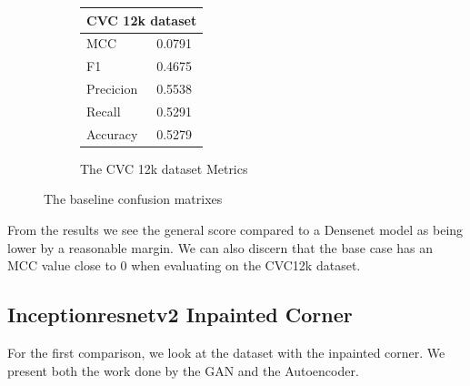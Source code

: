 \begin{figure}[h]
\begin{subfigure}[b]{0.25\textwidth}
        \begin{tabular}{ll}
        \toprule
        \multicolumn{2}{c}{CVC 12k dataset}        \\
        \midrule
        MCC 		& 0.0791 \\
        F1  		& 0.4675 \\
        Precicion  	& 0.5538 \\
        Recall     	& 0.5291 \\
        Accuracy	& 0.5279 \\
        \bottomrule
        \end{tabular}
\caption{The CVC 12k dataset Metrics}
\label{tab:cvc12k_metrics_IRV2_base}
\end{subfigure}
\caption{The baseline confusion matrixes}
\label{fig:results_IRV2_base}
\end{figure}
\FloatBarrier

From the results we see the general score compared to a Densenet model as being lower by a reasonable margin. We can also discern that the base case has an MCC value close to 0 when evaluating on the CVC12k dataset.


\subsection{Inceptionresnetv2 Inpainted Corner}

For the first comparison, we look at the dataset with the inpainted corner. We present both the work done by the GAN and the Autoencoder. 


